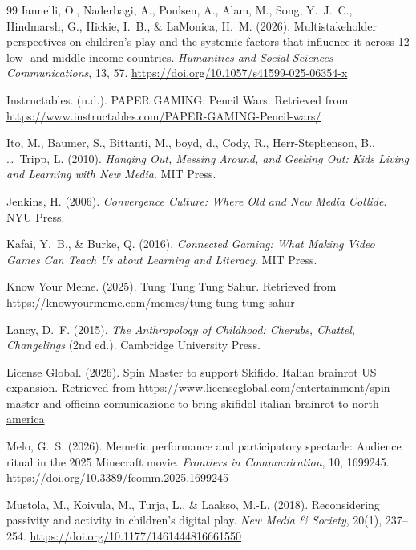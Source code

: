 \documentclass[12pt]{article}
\begin{document}
\begin{thebibliography}{99}
Iannelli, O., Naderbagi, A., Poulsen, A., Alam, M., Song, Y.~J.~C., Hindmarsh, G., Hickie, I.~B., \& LaMonica, H.~M. (2026).
\newblock Multistakeholder perspectives on children's play and the systemic factors that influence it across 12 low- and middle-income countries.
\newblock \emph{Humanities and Social Sciences Communications}, 13, 57.
\newblock \url{https://doi.org/10.1057/s41599-025-06354-x}

Instructables. (n.d.).
\newblock PAPER GAMING: Pencil Wars.
\newblock Retrieved from \url{https://www.instructables.com/PAPER-GAMING-Pencil-wars/}

Ito, M., Baumer, S., Bittanti, M., boyd, d., Cody, R., Herr-Stephenson, B., \ldots\ Tripp, L. (2010).
\newblock \emph{Hanging Out, Messing Around, and Geeking Out: Kids Living and Learning with New Media}.
\newblock MIT Press.

Jenkins, H. (2006).
\newblock \emph{Convergence Culture: Where Old and New Media Collide}.
\newblock NYU Press.

Kafai, Y.~B., \& Burke, Q. (2016).
\newblock \emph{Connected Gaming: What Making Video Games Can Teach Us about Learning and Literacy}.
\newblock MIT Press.

Know Your Meme. (2025).
\newblock Tung Tung Tung Sahur.
\newblock Retrieved from \url{https://knowyourmeme.com/memes/tung-tung-tung-sahur}

Lancy, D.~F. (2015).
\newblock \emph{The Anthropology of Childhood: Cherubs, Chattel, Changelings} (2nd ed.).
\newblock Cambridge University Press.

License Global. (2026).
\newblock Spin Master to support Skifidol Italian brainrot US expansion.
\newblock Retrieved from \url{https://www.licenseglobal.com/entertainment/spin-master-and-officina-comunicazione-to-bring-skifidol-italian-brainrot-to-north-america}

Melo, G.~S. (2026).
\newblock Memetic performance and participatory spectacle: Audience ritual in the 2025 Minecraft movie.
\newblock \emph{Frontiers in Communication}, 10, 1699245.
\newblock \url{https://doi.org/10.3389/fcomm.2025.1699245}

Mustola, M., Koivula, M., Turja, L., \& Laakso, M.-L. (2018).
\newblock Reconsidering passivity and activity in children's digital play.
\newblock \emph{New Media \& Society}, 20(1), 237--254.
\newblock \url{https://doi.org/10.1177/1461444816661550}


\end{thebibliography}
\end{document}
